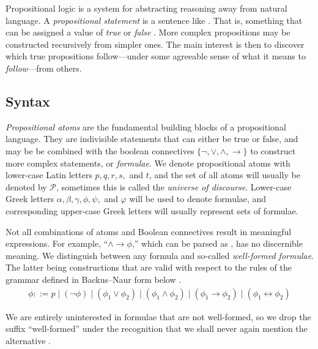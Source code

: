 Propositional logic is a system for abstracting reasoning away from natural language. A \textit{propositional statement}
is a sentence like . That is, something that can be assigned a value of \textit{true} or
\textit{false} \cite{Ben1993Mathematical}. More complex propositions may be constructed recursively from simpler ones.
The main interest is then to discover which true propositions follow---under some agreeable sense of what it means to
\textit{follow}---from others.

\subsection{Syntax}
\label{subsection:syntax}       
 \textit{Propositional atoms} are the fundamental building blocks of a propositional
language. They are indivisible statements that can either be true or false, and may be be combined with the boolean
connectives $\{\neg, \lor, \land, \rightarrow \}$ to construct more complex statements, or \textit{formulae}. We denote propositional
atoms with lower-case Latin letters $p,q,r,s,$ and $t$, and the set of all atoms will usually be denoted by
$\mathcal{P}$, sometimes this is called the \textit{universe of discourse}. Lower-case Greek letters $\alpha, \beta, \gamma
, \phi, \psi,$ and $\varphi$ will be used to denote formulae, and corresponding upper-case Greek letters will usually
represent sets of formulae.

Not all combinations of atoms and Boolean connectives result in meaningful expressions. For example, ``$\land \rightarrow
\phi$,'' which can be parsed as , has no discernible meaning. We distinguish
between any formula and so-called \textit{well-formed formulae}. The latter being constructions that are valid with
respect to the rules of the grammar defined in Backus--Naur form below \cite{Huth_Ryan_2004}.
%
\begin{align}
	\phi ::= p \mid (\neg \phi) \mid (\phi_{1}\lor \phi_{2}) \mid (\phi_{1}\land \phi_{2}) \mid (\phi_{1}\rightarrow \phi_{2}) \mid (\phi_{1}\leftrightarrow \phi_{2})
\end{align}

We are entirely uninterested in formulae that are not well-formed, so we drop the suffix ``well-formed'' under the
recognition that we shall never again mention the alternative \cite{Huth_Ryan_2004}.


